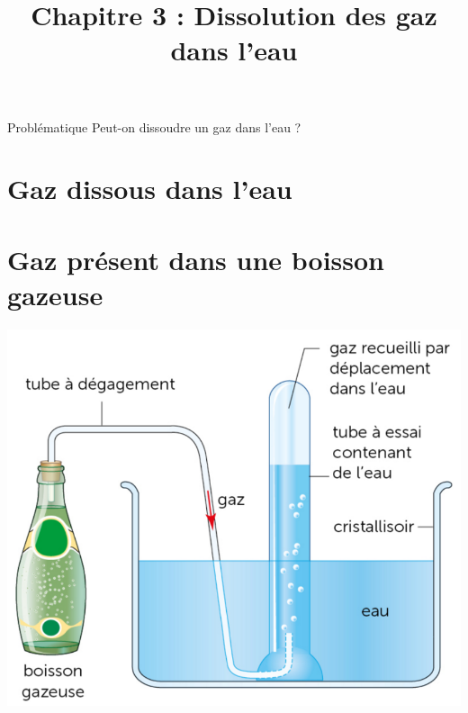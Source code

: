 \documentclass[xcolor={dvipsnames}]{beamer}
\title{Chapitre 3 : Dissolution des gaz dans l'eau}
\begin{document}
\begin{frame}
  \titlepage 
\end{frame}


\begin{frame}
\begin{block}{Problématique}
	{\Large Peut-on dissoudre un gaz dans l'eau ?}
\end{block}
\end{frame}


\section{Gaz dissous dans l'eau}




\begin{frame}
	
\end{frame}



\section{Gaz présent dans une boisson gazeuse}

\begin{frame}
	
\end{frame}

\begin{frame}
	\begin{center}
		\includegraphics[scale=0.4]{recueil}
	\end{center}
\end{frame}

%
%	
%
%
%	
\end{document}
